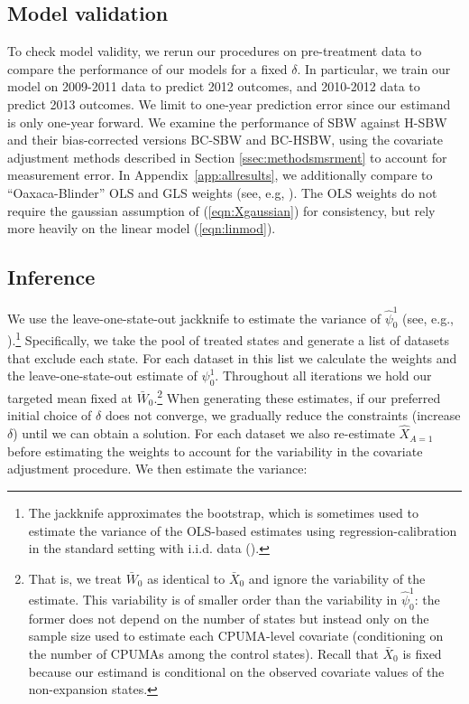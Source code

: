 \documentclass[aoas]{imsart}
\theoremstyle{plain}
\theoremstyle{remark}
\begin{document}
\subsection{Model validation}

To check model validity, we rerun our procedures on pre-treatment data to compare the performance of our models for a fixed $\delta$. In particular, we train our model on 2009-2011 data to predict 2012 outcomes, and 2010-2012 data to predict 2013 outcomes. We limit to one-year prediction error since our estimand is only one-year forward. We examine the performance of SBW against H-SBW and their bias-corrected versions BC-SBW and BC-HSBW, using the covariate adjustment methods described in Section \ref{ssec:methodsmsrment} to account for measurement error. In Appendix~\ref{app:allresults}, we additionally compare to ``Oaxaca-Blinder'' OLS and GLS weights (see, e.g, \cite{kline2011oaxaca}). The OLS weights do not require the gaussian assumption of (\ref{eqn:Xgaussian}) for consistency, but rely more heavily on the linear model (\ref{eqn:linmod}).

\subsection{Inference}

We use the leave-one-state-out jackknife to estimate the variance of $\hat{\psi}_0^1$ (see, e.g., \cite{cameron2015practitioner}).\footnote{The jackknife approximates the bootstrap, which is sometimes used to estimate the variance of the OLS-based estimates using regression-calibration in the standard setting with i.i.d. data (\cite{carroll2006measurement}).} Specifically, we take the pool of treated states and generate a list of datasets that exclude each state. For each dataset in this list we calculate the weights and the leave-one-state-out estimate of $\psi_0^1$. Throughout all iterations we hold our targeted mean fixed at $\bar{W}_0$.\footnote{That is, we treat $\bar{W}_0$ as identical to $\bar{X}_0$ and ignore the variability of the estimate. This variability is of smaller order than the variability in $\hat{\psi}_0^1$: the former does not depend on the number of states but instead only on the sample size used to estimate each CPUMA-level covariate (conditioning on the number of CPUMAs among the control states). Recall that $\bar{X}_0$ is fixed because our estimand is conditional on the observed covariate values of the non-expansion states.} When generating these estimates, if our preferred initial choice of $\delta$ does not converge, we gradually reduce the constraints (increase $\delta$) until we can obtain a solution. For each dataset we also re-estimate $\hat{X}_{A=1}$ before estimating the weights to account for the variability in the covariate adjustment procedure. We then estimate the variance:
\end{document}
